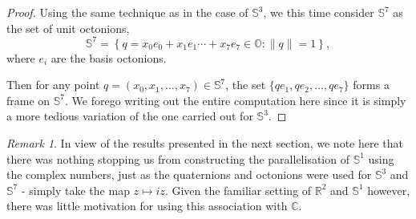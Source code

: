 \documentclass[12pt,a4paper]{article}
\numberwithin{equation}{section}
\theoremstyle{definition}
\theoremstyle{remark}
\newtheorem{remark}{Remark}
\begin{document}
\begin{proof}
Using the same technique as in the case of $\mathbb{S}^3$, we this time consider $\mathbb{S}^7$ as the set of unit octonions,
\[
\mathbb{S}^7=\left\{q=x_0e_0+x_1e_1\cdots+x_7e_7\in\mathbb{O}:\|q\|=1 \right\},
\]
where $e_i$ are the basis octonions.

Then for any point $q=(x_0,x_1,\ldots,x_7)\in\mathbb{S}^7$, the set $\{qe_1,qe_2,\ldots,qe_7\}$ forms a frame on $\mathbb{S}^7$.
We forego writing out the entire computation here since it is simply a more tedious variation of the one carried out for $\mathbb{S}^3$.

\end{proof}
\begin{remark}
In view of the results presented in the next section, we note here that there was nothing stopping us from constructing the parallelisation of $\mathbb{S}^1$ using the complex numbers, just as the quaternions and octonions were used for $\mathbb{S}^3$ and $\mathbb{S}^7$ - simply take the map $z\mapsto iz$. Given the familiar setting of $\mathbb{R}^2$ and $\mathbb{S}^1$ however, there was little motivation for using this association with $\mathbb{C}$.
\end{remark}

\pagebreak
\end{document}
